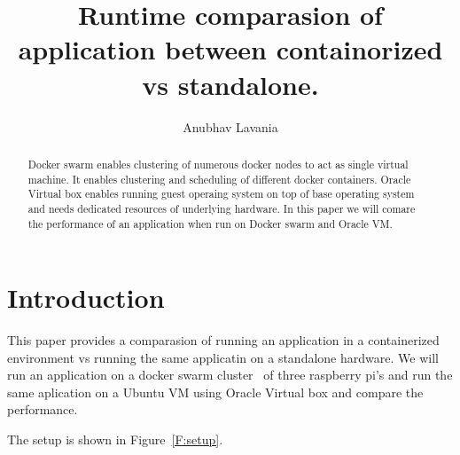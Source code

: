 
\title{Runtime comparasion of application between containorized vs standalone.}

\author{Anubhav Lavania}


\renewcommand{\shortauthors}{G. v. Laszewski}


\begin{abstract}
  Docker swarm enables clustering of numerous docker nodes to act as
  single virtual machine. It enables clustering and scheduling of
  different docker containers. Oracle Virtual box enables running
  guest operaing system on top of base operating system and needs
  dedicated resources of underlying hardware. In this paper we will
  comare the performance of an application when run on Docker swarm
  and Oracle VM.

\end{abstract}



\maketitle


\section{Introduction}

This paper provides a comparasion of running an application in a
containerized environment vs running the same applicatin on a
standalone hardware. We will run an application on a docker swarm
cluster~\cite{hid-sp18-413-dockerswarm} of three raspberry pi's and
run the same aplication on a Ubuntu VM using Oracle Virtual box and
compare the performance.

The setup is shown in Figure~\ref{F:setup}.

